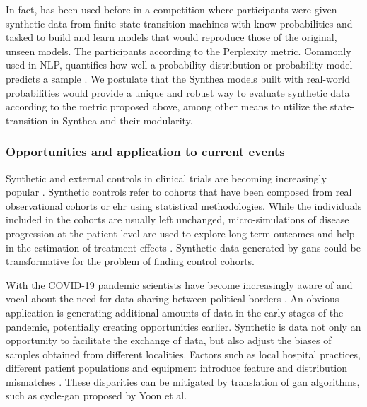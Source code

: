 In fact, has been used before in a competition where participants were given synthetic data from finite state transition machines with know probabilities and tasked to build and learn models that would reproduce those of the original, unseen models. The participants according to the Perplexity metric. Commonly used in NLP, quantifies how well a probability distribution or probability model predicts a sample \cite{Verwer_2013}. We postulate that the Synthea models built with real-world probabilities would provide a unique and robust way to evaluate synthetic data according to the metric proposed above, among other means to utilize the state-transition in Synthea and their modularity.

\subsubsection{Opportunities and application to current events}
Synthetic and external controls in clinical trials are becoming increasingly popular \cite{Thorlund2020}. Synthetic controls refer to cohorts that have been composed from real observational cohorts or \gls{ehr} using statistical methodologies. While the individuals included in the cohorts are usually left unchanged, micro-simulations of disease progression at the patient level are used to explore long-term outcomes and help in the estimation of treatment effects \cite{Thorlund2020, Etzioni2002}. Synthetic data generated by \glspl{gan} could be transformative for the problem of finding control cohorts.\par
With the COVID-19 pandemic scientists have become increasingly aware of and vocal about the need for data sharing between political borders \cite{Cosgriff_2020,Becker_2020,McLennan_2020}. An obvious application is generating additional amounts of data in the early stages of the pandemic, potentially creating opportunities earlier. Synthetic is data not only an opportunity to facilitate the exchange of data, but also adjust the biases of samples obtained from different localities. Factors such as local hospital practices, different patient populations and equipment introduce feature and distribution mismatches \cite{Ghassemi2020}. These disparities can be mitigated by translation of \gls{gan} algorithms, such as \gls{cycle-gan} proposed by Yoon et al.